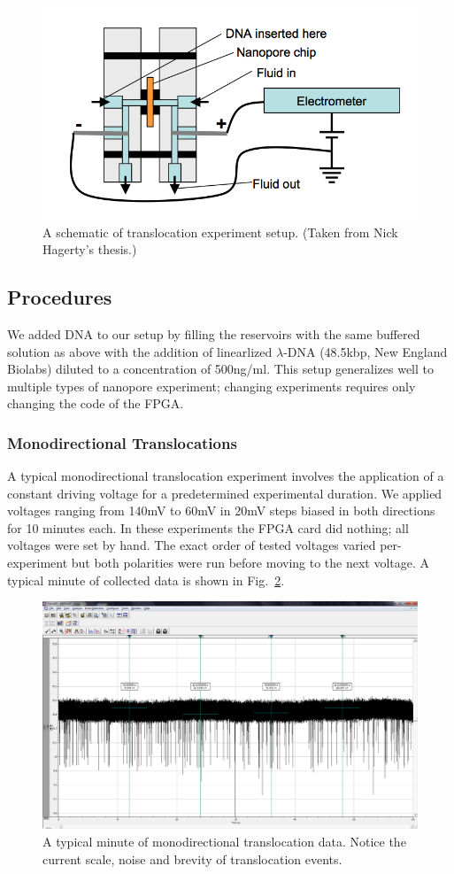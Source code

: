 \documentclass[aps,prl,preprint,groupedaddress]{revtex4}
\begin{document}
\begin{figure}
\centering
\includegraphics[width=.6\textwidth]{figures/chuck}
\caption{A schematic of translocation experiment setup. (Taken from Nick Hagerty's thesis.)}
\label{fig:chuck}
\end{figure}

\subsection{Procedures}

We added DNA to our setup by filling the reservoirs with the same buffered solution as above with the addition of linearlized $\lambda$-DNA (48.5kbp, New England Biolabs) diluted to a concentration of 500ng/ml.
This setup generalizes well to multiple types of nanopore experiment; changing experiments requires only changing the code of the FPGA.

\subsubsection{Monodirectional Translocations}

A typical monodirectional translocation experiment involves the application of a constant driving voltage for a predetermined experimental duration.
We applied voltages ranging from 140mV to 60mV in 20mV steps biased in both directions for 10 minutes each.
In these experiments the FPGA card did nothing; all voltages were set by hand.
The exact order of tested voltages varied per-experiment but both polarities were run before moving to the next voltage.
A typical minute of collected data is shown in Fig.~\ref{fig:trans-data}.
\begin{figure}[h]
\centering
\includegraphics[width=1\textwidth]{figures/monodirectional-minute}
\caption{A typical minute of monodirectional translocation data. Notice the current scale, noise and brevity of translocation events.}
\label{fig:trans-data}
\end{figure}
\end{document}
